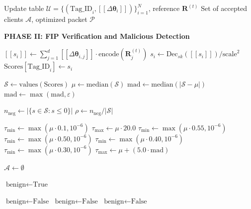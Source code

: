 \documentclass[10pt,journal,compsoc]{IEEEtran}
\begin{document}
\begin{algorithm}[H]
\caption{FIP-FL Per-Round Verification Protocol (Part 2: FIP Verification)}
\label{alg:round2}
\begin{algorithmic}[1]
\Require Update table $\mathcal{U} = \{(\text{Tag\_ID}_i, [\![\Delta\bm{\theta}_i]\!])\}_{i=1}^N$, reference $\mathbf{R}^{(t)}$
\Ensure Set of accepted clients $\mathcal{A}$, optimized packet $\mathcal{P}$

\Statex \textbf{PHASE II: FIP Verification and Malicious Detection}

    \State $[\![s_i]\!] \gets \sum_{j=1}^{d} [\![\Delta \bm{\theta}_{i,j}]\!] \cdot \text{encode}(\mathbf{R}^{(t)}_j)$ 
    \State $s_i \gets \text{Dec}_{sk}([\![s_i]\!]) / \text{scale}^2$
    \State $\text{Scores}[\text{Tag\_ID}_i] \gets s_i$
\EndFor

\State $\mathcal{S} \gets \text{values}(\text{Scores})$
\State $\mu \gets \text{median}(\mathcal{S})$
\State $\text{mad} \gets \text{median}(|\mathcal{S} - \mu|)$
\State $\text{mad} \gets \max(\text{mad}, \varepsilon)$

\State $n_{\text{neg}} \gets |\{s \in \mathcal{S} : s \leq 0\}|$
\State $\rho \gets n_{\text{neg}} / |\mathcal{S}|$ 

    \State $\tau_{\min} \gets \max(\mu \cdot 0.1, 10^{-6})$
    \State $\tau_{\max} \gets \mu \cdot 20.0$
\Else
     $\tau_{\min} \gets \max(\mu \cdot 0.55, 10^{-6})$
     $\tau_{\min} \gets \max(\mu \cdot 0.50, 10^{-6})$
     $\tau_{\min} \gets \max(\mu \cdot 0.40, 10^{-6})$
    \Else $\tau_{\min} \gets \max(\mu \cdot 0.30, 10^{-6})$
    \EndIf
    \State $\tau_{\max} \gets \mu + (5.0 \cdot \text{mad})$
\EndIf

\State $\mathcal{A} \gets \emptyset$

    \State $\text{benign} \gets \text{True}$
    
     $\text{benign} \gets \text{False}$ 
     $\text{benign} \gets \text{False}$ 
     $\text{benign} \gets \text{False}$ 
    \EndIf
    

\end{algorithmic}
\end{algorithm}
\end{document}
